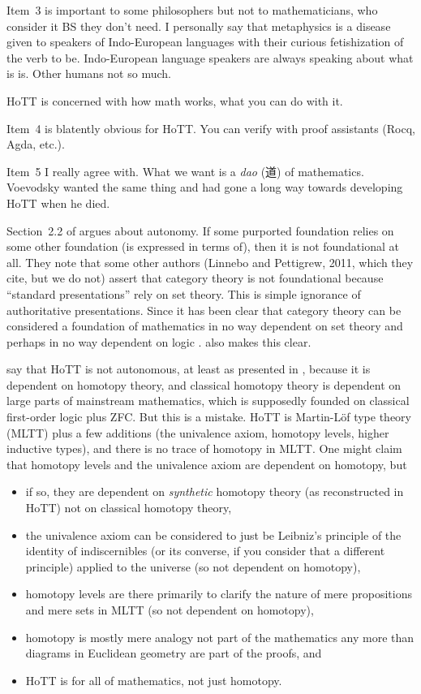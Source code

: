 \documentclass[11pt]{article}
\begin{document}
Item~3 is important to some philosophers but not to mathematicians,
who consider it BS they don't need.  I personally say that metaphysics
is a disease given to speakers of Indo-European languages with their
curious fetishization of the verb to be.  Indo-European language speakers
are always speaking about what is is.  Other humans not so much.

HoTT is concerned with how math works, what you can do with it.

Item~4 is blatently obvious for HoTT.  You can verify with proof assistants
(Rocq, Agda, etc.).

Item~5 I really agree with.  What we want is a \emph{dao} (道) of mathematics.
Voevodsky wanted the same thing and had gone a long way towards developing
HoTT when he died.

Section~2.2 of \citet{ladyman-presnell-foundations} argues about autonomy.
If some purported foundation relies on some other foundation (is expressed
in terms of), then it is not foundational at all.
They note that some other authors (Linnebo and Pettigrew, 2011,
which they cite, but we do not)
assert that category theory is not foundational because
``standard presentations'' rely on set theory.  This is simple ignorance
of authoritative presentations.  Since \citet{lawvere-cat-of-cat} it has
been clear that category theory can be considered a foundation of mathematics
in no way dependent on set theory and perhaps in no way dependent on logic
\citep{lawvere-thesis}.  \citet{maclane} also makes this clear.

\citet{ladyman-presnell-foundations} say that HoTT is not autonomous,
at least as presented in 
\citet[hereinafter referred to as the HoTT book]{hott-book},
because it is dependent on homotopy theory, and classical homotopy theory
is dependent on large parts of mainstream mathematics, which is supposedly
founded on classical first-order logic plus ZFC.  But this is a mistake.
HoTT is Martin-L\"{o}f type theory (MLTT) \citep{martin-lof-mltt}
plus a few additions (the univalence axiom, homotopy levels, higher
inductive types), and there is no trace of homotopy in MLTT.
One might claim that homotopy levels and the univalence axiom are dependent
on homotopy, but
\begin{itemize}
\item if so, they are dependent on \emph{synthetic} homotopy theory (as
    reconstructed in HoTT) not on classical homotopy theory,
\item the univalence axiom can be considered to just be Leibniz's principle
    of the identity of indiscernibles (or its converse, if you consider that
    a different principle) applied to the universe (so not
    dependent on homotopy),
\item homotopy levels are there primarily to clarify the nature of mere
    propositions and mere sets in MLTT (so not dependent on homotopy),
\item homotopy is mostly mere analogy not part of the mathematics any more
    than diagrams in Euclidean geometry are part of the proofs, and
\item HoTT is for all of mathematics, not just homotopy.
\end{itemize}
\end{document}
